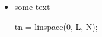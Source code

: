 \begin{itemize}
	\item some text
\begin{MatlabCode}
tn = linspace(0, L, N);
\end{MatlabCode}
\end{itemize}

